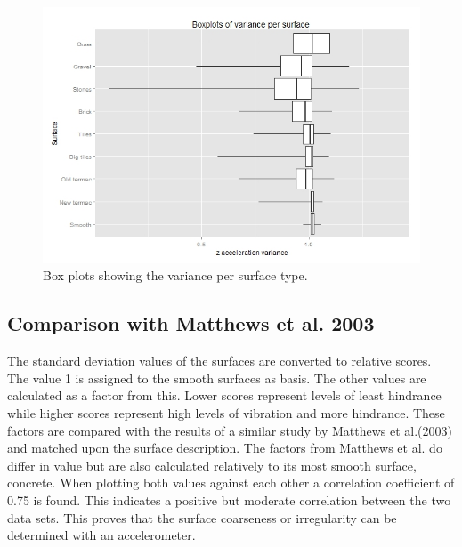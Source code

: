 \begin{figure}[hb]
\includegraphics[width=\textwidth]{img/R_Surfaces_Variance.jpeg}
\centering
\caption{Box plots showing the variance per surface type.\label{boxhindrance}}
\end{figure} 

\clearpage

\subsection{Comparison with Matthews et al. 2003}
The standard deviation values of the surfaces are converted to relative scores. The value 1 is assigned to the smooth surfaces as basis. The other values are calculated as a factor from this. Lower scores represent levels of least hindrance while higher scores represent high levels of vibration and more hindrance. These factors are compared with the results of a similar study by Matthews et al.(2003) and matched upon the surface description. The factors from Matthews et al. do differ in value but are also calculated relatively to its most smooth surface, concrete. When plotting both values against each other a correlation coefficient of 0.75 is found. This indicates a positive but moderate correlation between the two data sets. This proves that the surface coarseness or irregularity can be determined with an accelerometer. 

